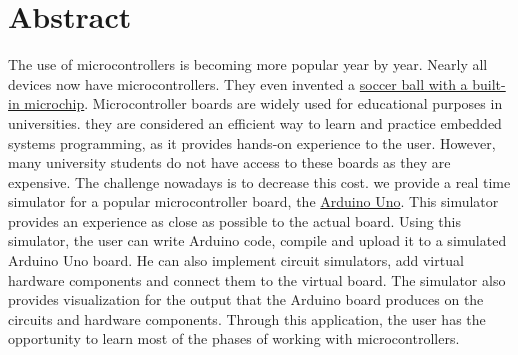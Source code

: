 \chapter*{Abstract}
\label{chap:abstract}

The use of microcontrollers is becoming more popular year by year. Nearly all devices now have microcontrollers. They even invented a \href{http://www.inquisitr.com/270421/goal-line-technology-being-tested-by-fifa-ifab/}{soccer ball with a built-in microchip}. Microcontroller boards are widely used for educational purposes in universities. they are considered an efficient way to learn and practice embedded systems programming, as it provides hands-on experience to the user. However, many university students do not have access to these boards as they are expensive. The challenge nowadays is to decrease this cost. we provide a real time simulator for a popular microcontroller board, the \href{http://arduino.cc/en/Main/ArduinoBoardUno}{Arduino Uno}. This simulator provides an experience as close as possible to the actual board. Using this simulator, the user can write Arduino code, compile and upload it to a simulated Arduino Uno board. He can also implement circuit simulators, add virtual hardware components and connect them to the virtual board. The simulator also provides visualization for the output that the Arduino board produces on the circuits and hardware components. Through this application, the user has the opportunity to learn most of the phases of working with microcontrollers.

